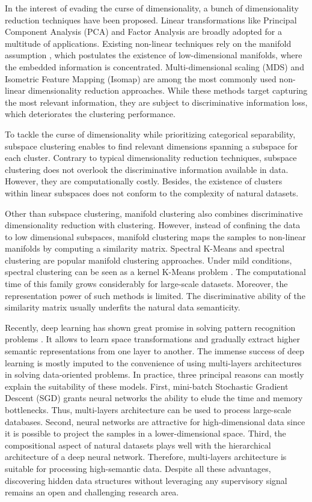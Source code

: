 \documentclass{article}
\begin{document}
In the interest of evading the curse of dimensionality, a bunch of dimensionality reduction techniques have been proposed. Linear transformations like Principal Component Analysis (PCA) \cite{paper49} and Factor Analysis \cite{paper50} are broadly adopted for a multitude of applications. Existing non-linear techniques rely on the manifold assumption \cite{paper52}, which postulates the existence of low-dimensional manifolds, where the embedded information is concentrated. Multi-dimensional scaling (MDS) \cite{paper51} and Isometric Feature Mapping (Isomap) \cite{paper52} are among the most commonly used non-linear dimensionality reduction approaches. While these methods target capturing the most relevant information, they are subject to discriminative information loss, which deteriorates the clustering performance. 

To tackle the curse of dimensionality while prioritizing categorical separability, subspace clustering \cite{paper13} enables to find relevant dimensions spanning a subspace for each cluster. Contrary to typical dimensionality reduction techniques, subspace clustering does not overlook the discriminative information available in data. However, they are computationally costly. Besides, the existence of clusters within linear subspaces does not conform to the complexity of natural datasets.

Other than subspace clustering, manifold clustering \cite{paper12} also combines discriminative dimensionality reduction with clustering. However, instead of confining the data to low dimensional subspaces, manifold clustering maps the samples to non-linear manifolds by computing a similarity matrix.
Spectral K-Means and spectral clustering are popular manifold clustering approaches. Under mild conditions, spectral clustering can be seen as a kernel K-Means problem \cite{paper97}. The computational time of this family grows considerably for large-scale datasets. Moreover, the representation power of such methods is limited. The discriminative ability of the similarity matrix usually underfits the natural data semanticity.

Recently, deep learning has shown great promise in solving pattern recognition problems \cite{paper85, paper86}. It allows to learn space transformations and gradually extract higher semantic representations from one layer to another. The immense success of deep learning is mostly imputed to the convenience of using multi-layers architectures in solving data-oriented problems. In practice, three principal reasons can mostly explain the suitability of these models. First, mini-batch Stochastic Gradient Descent (SGD) grants neural networks the ability to elude the time and memory bottlenecks. Thus, multi-layers architecture can be used to process large-scale databases. Second, neural networks are attractive for high-dimensional data since it is possible to project the samples in a lower-dimensional space. Third, the compositional aspect of natural datasets plays well with the hierarchical architecture of a deep neural network. Therefore, multi-layers architecture is suitable for processing high-semantic data. Despite all these advantages, discovering hidden data structures without leveraging any supervisory signal remains an open and challenging research area.
\end{document}
